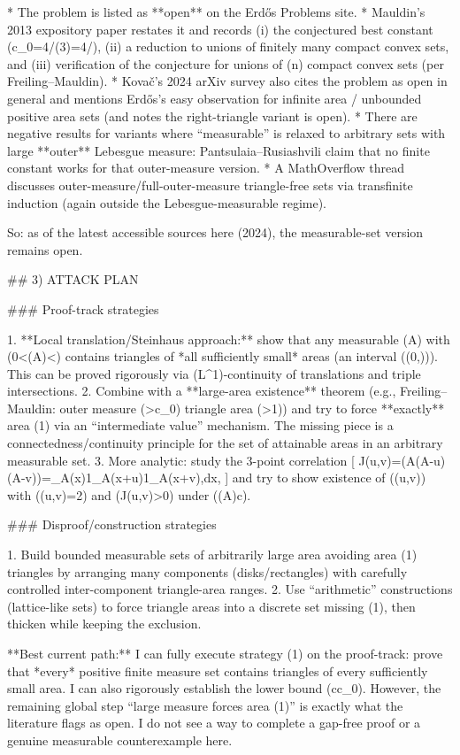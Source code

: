 * The problem is listed as **open** on the Erdős Problems site.
* Mauldin’s 2013 expository paper restates it and records (i) the conjectured best constant (c_0=4\pi/(3)=4\pi/), (ii) a reduction to unions of finitely many compact convex sets, and (iii) verification of the conjecture for unions of (n) compact convex sets (per Freiling–Mauldin).
* Kovač’s 2024 arXiv survey also cites the problem as open in general and mentions Erdős’s easy observation for infinite area / unbounded positive area sets (and notes the right-triangle variant is open).
* There are negative results for variants where “measurable” is relaxed to arbitrary sets with large **outer** Lebesgue measure: Pantsulaia–Rusiashvili claim that no finite constant works for that outer-measure version.
* A MathOverflow thread discusses outer-measure/full-outer-measure triangle-free sets via transfinite induction (again outside the Lebesgue-measurable regime).

So: as of the latest accessible sources here (2024), the measurable-set version remains open.

## 3) ATTACK PLAN

### Proof-track strategies

1. **Local translation/Steinhaus approach:** show that any measurable (A) with (0<\mu(A)<\infty) contains triangles of *all sufficiently small* areas (an interval ((0,\varepsilon))). This can be proved rigorously via (L^1)-continuity of translations and triple intersections.
2. Combine with a **large-area existence** theorem (e.g., Freiling–Mauldin: outer measure (>c_0\Rightarrow) triangle area (>1)) and try to force **exactly** area (1) via an “intermediate value” mechanism. The missing piece is a connectedness/continuity principle for the set of attainable areas in an arbitrary measurable set.
3. More analytic: study the 3-point correlation
   [
   J(u,v)=\mu\bigl(A\cap(A-u)\cap(A-v)\bigr)=_A(x)1_A(x+u)1_A(x+v),dx,
   ]
   and try to show existence of ((u,v)) with (\det(u,v)=2) and (J(u,v)>0) under (\mu(A)\ge c).

### Disproof/construction strategies

1. Build bounded measurable sets of arbitrarily large area avoiding area (1) triangles by arranging many components (disks/rectangles) with carefully controlled inter-component triangle-area ranges.
2. Use “arithmetic” constructions (lattice-like sets) to force triangle areas into a discrete set missing (1), then thicken while keeping the exclusion.

**Best current path:** I can fully execute strategy (1) on the proof-track: prove that *every* positive finite measure set contains triangles of every sufficiently small area. I can also rigorously establish the lower bound (c\ge c_0). However, the remaining global step “large measure forces area (1)” is exactly what the literature flags as open. I do not see a way to complete a gap-free proof or a genuine measurable counterexample here.

